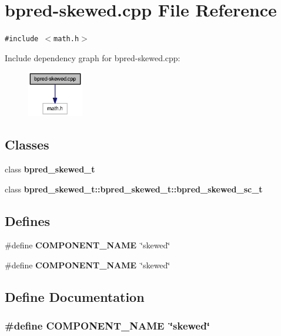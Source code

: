 \section{bpred-skewed.cpp File Reference}
\label{bpred-skewed_8cpp}
{\tt \#include $<$math.h$>$}\par


Include dependency graph for bpred-skewed.cpp:\nopagebreak
\begin{figure}[H]
\begin{center}
\leavevmode
\includegraphics[width=69pt]{bpred-skewed_8cpp__incl}
\end{center}
\end{figure}
\subsection*{Classes}
\begin{CompactItemize}
\item 
class {\bf bpred\_\-skewed\_\-t}
\item 
class {\bf bpred\_\-skewed\_\-t::bpred\_\-skewed\_\-t::bpred\_\-skewed\_\-sc\_\-t}
\end{CompactItemize}
\subsection*{Defines}
\begin{CompactItemize}
\item 
\#define {\bf COMPONENT\_\-NAME}~\char`\"{}skewed\char`\"{}
\item 
\#define {\bf COMPONENT\_\-NAME}~\char`\"{}skewed\char`\"{}
\end{CompactItemize}


\subsection{Define Documentation}
\subsubsection[{COMPONENT\_\-NAME}]{\setlength{\rightskip}{0pt plus 5cm}\#define COMPONENT\_\-NAME~\char`\"{}skewed\char`\"{}}\label{zesto-bpred_8cpp_9146ade7ce24e3db226a973a59063892}


